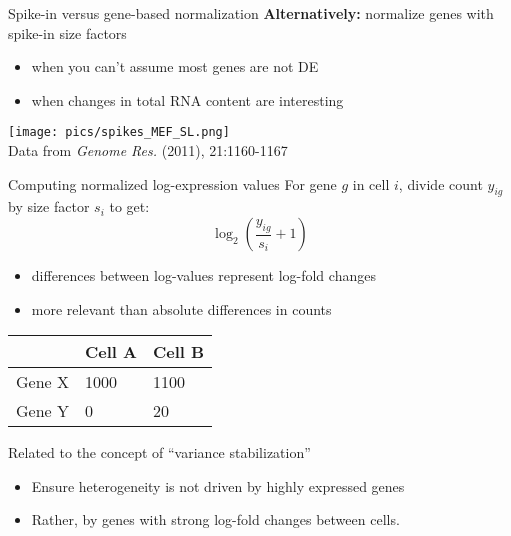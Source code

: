 \documentclass{beamer}
\begin{document}
\begin{frame}{Spike-in versus gene-based normalization}
    \vspace{0.1in}
\textbf{Alternatively:} normalize genes with spike-in size factors
\begin{itemize}
    \item when you can't assume most genes are not DE
    \item when changes in total RNA content are interesting
\end{itemize}
\begin{center}
    \texttt{[image: pics/spikes\_MEF\_SL.png]}\\
    {\tiny Data from \emph{Genome Res.} (2011), 21:1160-1167}
\end{center}
\end{frame}

\begin{frame}{Computing normalized log-expression values}
    For gene $g$ in cell $i$, divide count $y_{ig}$ by size factor $s_i$ to get:
    \[
        \log_2\left(\frac{y_{ig}}{s_{i}} + 1\right)
    \]
    
\begin{itemize}
    \item differences between log-values represent log-fold changes
    \item more relevant than absolute differences in counts
\end{itemize}
\begin{center}
\begin{tabular}{l l l}
\hline
& Cell A & Cell B \\
\hline
Gene X & 1000 & 1100 \\
Gene Y & 0 & 20 \\
\hline
\end{tabular}
\end{center}
Related to the concept of ``variance stabilization''
\begin{itemize}
\item Ensure heterogeneity is not driven by highly expressed genes
\item Rather, by genes with strong log-fold changes between cells.
\end{itemize}
\end{frame}
\end{document}

